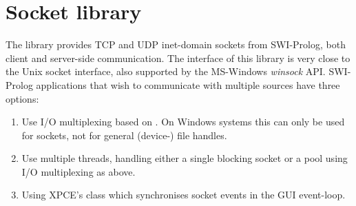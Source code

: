 \documentclass[11pt]{article}
\begin{document}
\section{Socket library}

The  library provides TCP and UDP inet-domain sockets from
SWI-Prolog, both client and server-side communication. The interface of
this library is very close to the Unix socket interface, also supported
by the MS-Windows {\em winsock} API.  SWI-Prolog applications that wish
to communicate with multiple sources have three options:

\begin{enumerate}
    \item Use I/O multiplexing based on .  On Windows
          systems this can only be used for sockets, not for general
	  (device-) file handles.
    \item Use multiple threads, handling either a single blocking socket
          or a pool using I/O multiplexing as above.
    \item Using XPCE's class  which synchronises socket
          events in the GUI event-loop.
\end{enumerate}
\end{document}

